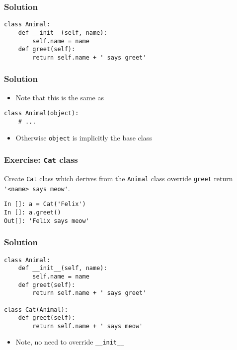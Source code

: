 \documentclass[14pt,compress,aspectratio=169]{beamer}
\begin{document}
\begin{frame}
  \frametitle{Solution}
\begin{lstlisting}
class Animal:
    def __init__(self, name):
        self.name = name
    def greet(self):
        return self.name + ' says greet'
\end{lstlisting}
\end{frame}

\begin{frame}
  \frametitle{Solution}
  \begin{itemize}
  \item Note that this is the same as
  \end{itemize}
\begin{lstlisting}
class Animal(object):
    # ...
\end{lstlisting}
  \begin{itemize}
  \item Otherwise \lstinline{object} is implicitly the base class
  \end{itemize}

\end{frame}

\begin{frame}[fragile]
  \frametitle{Exercise: \lstinline{Cat} class}
  \begin{block}{}
    Create \lstinline{Cat} class which derives from the \lstinline{Animal}
    class \alert{override} \lstinline{greet} return
    \lstinline{'<name> says meow'}.
  \end{block}
\begin{lstlisting}
In []: a = Cat('Felix')
In []: a.greet()
Out[]: 'Felix says meow'
\end{lstlisting}
\end{frame}


\begin{frame}
  \frametitle{Solution}
\begin{lstlisting}
class Animal:
    def __init__(self, name):
        self.name = name
    def greet(self):
        return self.name + ' says greet'

class Cat(Animal):
    def greet(self):
        return self.name + ' says meow'
\end{lstlisting}
  \begin{itemize}
  \item Note, no need to override \lstinline{__init__}
  \end{itemize}
\end{frame}
\end{document}
